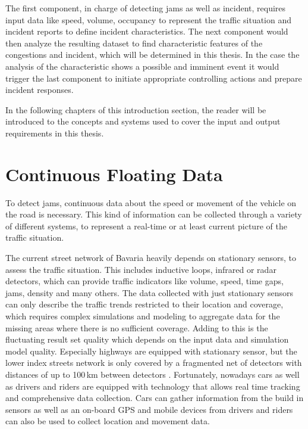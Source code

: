 \documentclass[a4paper,headsepline,footsepline,fontsize=11pt,BCOR=12mm,DIV=12]{report}
\begin{document}
The first component, in charge of detecting \glspl{jam} as well as incident, requires input data like speed, volume, occupancy to represent the traffic situation and incident reports to define incident characteristics. The next component would then analyze the resulting dataset to find characteristic features of the congestions and incident, which will be determined in this thesis. In the case the analysis of the characteristic shows a possible and imminent event it would trigger the last component to initiate appropriate controlling actions and prepare incident responses.

In the following chapters of this introduction section, the reader will be introduced to the concepts and systems used to cover the input and output requirements in this thesis.

\section{Continuous Floating Data}

To detect \glspl{jam}, continuous data about the speed or movement of the vehicle on the road is necessary. This kind of information can be collected through a variety of different systems, to represent a real-time or at least current picture of the traffic situation. 

The current street network of Bavaria heavily depends on stationary sensors, to assess the traffic situation. This includes inductive loops, infrared or radar detectors, which can provide traffic indicators like volume, speed, time gaps, jams, density and many others. The data collected with just stationary sensors can only describe the traffic trends restricted to their location and coverage, which requires complex simulations and modeling to aggregate data for the missing areas where there is no sufficient coverage. Adding to this is the fluctuating result set quality which depends on the input data and simulation model quality. Especially highways are equipped with stationary sensor, but the lower index streets network is only covered by a fragmented net of detectors with distances of up to 100\,km between detectors \cite{INDRIX2015}. Fortunately, nowadays cars as well as drivers and riders are equipped with technology that allows real time tracking and comprehensive data collection. Cars can gather information from the build in sensors as well as an on-board GPS and mobile devices from drivers and riders can also be used to collect location and movement data. \cite{Randelhoff2016}
\end{document}
